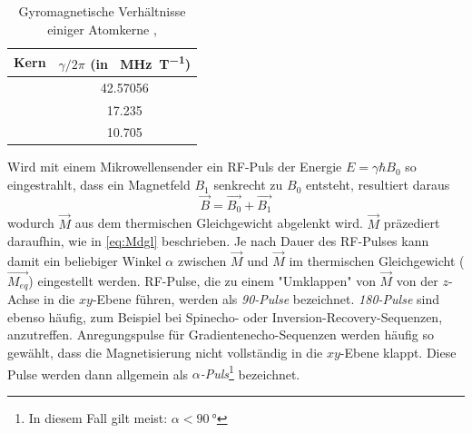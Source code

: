 \begin{table}[H]
	\centering
	\caption[Auswahl gyromagnetischer Verhältnisse]{Gyromagnetische Verhältnisse einiger Atomkerne \cite{Seidel2015},\cite{Weast1984}}
	\label{tab:gyroV}
	\begin{tabular}{lS}
		\toprule
		\textbf{Kern} & \textbf{$\gamma/2\pi$ (in \SI{}{\mega\hertz\per\tesla})} \\
		\midrule
		 & 42.57056 \\
		 & 17.235 \\
		 & 10.705 \\
		\bottomrule
	\end{tabular}
\end{table}

Wird mit einem Mikrowellensender ein RF-Puls der Energie $E=\gamma \hbar B_0$ so eingestrahlt, dass ein Magnetfeld $B_1$ senkrecht zu $B_0$ entsteht, resultiert daraus
\begin{equation}
	\vec{B}=\vec{B_0}+\vec{B_1}
\end{equation}
wodurch $\vec{M}$ aus dem thermischen Gleichgewicht abgelenkt wird. $\vec{M}$ präzediert daraufhin, wie in \autoref{eq:Mdgl} beschrieben. Je nach Dauer des RF-Pulses kann damit ein beliebiger Winkel $\alpha$ zwischen $\vec{M}$ und $\vec{M}$ im thermischen Gleichgewicht ($\vec{M_{eq}}$) eingestellt werden.
RF-Pulse, die zu einem "Umklappen" von $\vec{M}$ von der $z$-Achse in die $xy$-Ebene führen, werden als \textit{90\degree-Pulse} bezeichnet. \textit{180\degree-Pulse} sind ebenso häufig, zum Beispiel bei Spinecho- oder Inversion-Recovery-Sequenzen, anzutreffen. Anregungspulse für Gradientenecho-Sequenzen werden häufig so gewählt, dass die Magnetisierung nicht vollständig in die $xy$-Ebene klappt. Diese Pulse werden dann allgemein als \textit{$\alpha$-Puls}\footnote{In diesem Fall gilt meist: $\alpha<\SI{90}{\degree}$} bezeichnet.

